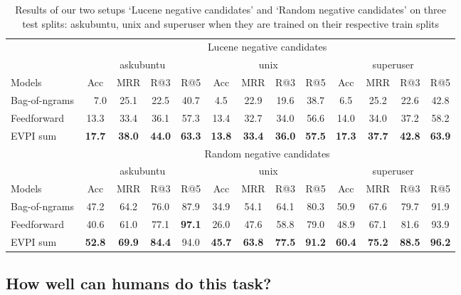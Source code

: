 \documentclass[11pt]{report}
\begin{document}
\begin{table}
\footnotesize
\centering
\begin{tabular}{l|cccc|cccc|cccc}
\toprule
&  \multicolumn{12}{c}{Lucene negative candidates}\\
 & \multicolumn{4}{c|}{askubuntu} & \multicolumn{4}{c|}{unix} & \multicolumn{4}{c}{superuser}\\
Models & Acc & MRR & R@3 & R@5 & Acc & MRR & R@3 & R@5 & Acc & MRR & R@3 & R@5\\
\midrule
Bag-of-ngrams  & ~~7.0 & 25.1 & 22.5 & 40.7&  4.5 & 22.9 & 19.6 & 38.7&  6.5 & 25.2 & 22.6 & 42.8\\
Feedforward & 13.3 & 33.4 & 36.1 & 57.3  & 13.4 & 32.7 & 34.0 & 56.6  & 14.0 & 34.0 &  37.2 & 58.2 \\
EVPI sum & \bf 17.7 & \bf 38.0 & \bf 44.0 & \bf 63.3  & \bf 13.8 & \bf 33.4 & \bf 36.0 & \bf 57.5 & \bf 17.3 & \bf 37.7 & \bf 42.8 & \bf 63.9 \\
\toprule
&  \multicolumn{12}{c}{Random negative candidates}\\
 & \multicolumn{4}{c|}{askubuntu} & \multicolumn{4}{c|}{unix} & \multicolumn{4}{c}{superuser}\\
Models & Acc & MRR & R@3 & R@5 & Acc & MRR & R@3 & R@5 & Acc & MRR & R@3 & R@5\\
\midrule
Bag-of-ngrams  &47.2 & 64.2 & 76.0 & 87.9 & 34.9 & 54.1 & 64.1 & 80.3 & 50.9 & 67.6 & 79.7 & 91.9\\
Feedforward & 40.6 & 61.0 & 77.1 & \bf 97.1  & 26.0 & 47.6 & 58.8 & 79.0  & 48.9 & 67.1 & 81.6 & 93.9 \\
EVPI sum & \bf 52.8 & \bf 69.9 & \bf 84.4 & 94.0  & \bf 45.7 & \bf 63.8 & \bf 77.5 & \bf 91.2 & \bf 60.4 & \bf 75.2 & \bf 88.5 & \bf 96.2 \\
\bottomrule
\end{tabular}
\caption{Results of our two setups `Lucene negative candidates' and `Random negative candidates' on three test splits: askubuntu, unix and superuser when they are trained on their respective train splits }
\label{results_topM}
\end{table}

\subsection{How well can humans do this task?}
\end{document}
